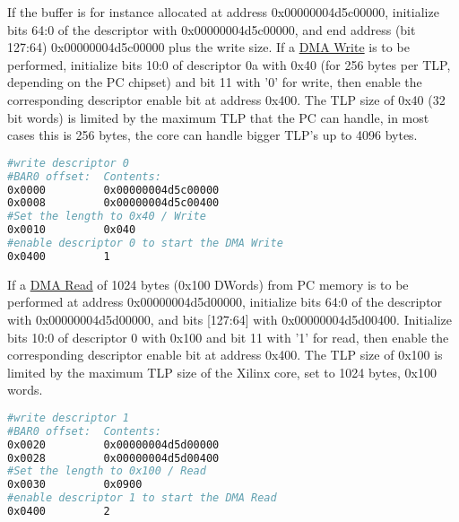 If the buffer is for instance allocated at address 0x00000004d5c00000, initialize bits 64:0 of the descriptor with 0x00000004d5c00000, and end address (bit 127:64) 0x00000004d5c00000 plus the write size. If a \underline{DMA Write} is to be performed, initialize bits 10:0 of descriptor 0a with 0x40 (for 256 bytes per TLP, depending on the PC chipset) and bit 11 with '0' for write, then enable the corresponding descriptor enable bit at address 0x400. The TLP size of 0x40 (32 bit words) is limited by the maximum TLP that the PC can handle, in most cases this is 256 bytes, the core can handle bigger TLP's up to 4096 bytes.
\begin{lstlisting}[language=BASH, frame=single, caption=Create a Write descriptor]
#write descriptor 0
#BAR0 offset:  Contents:
0x0000         0x00000004d5c00000
0x0008         0x00000004d5c00400
#Set the length to 0x40 / Write
0x0010         0x040
#enable descriptor 0 to start the DMA Write
0x0400         1
\end{lstlisting}
If a \underline{DMA Read} of 1024 bytes (0x100 DWords) from PC memory is to be performed at address 0x00000004d5d00000, initialize bits 64:0 of the descriptor with 0x00000004d5d00000, and bits [127:64] with 0x00000004d5d00400. Initialize bits 10:0 of descriptor 0 with 0x100 and bit 11 with '1' for read, then enable the corresponding descriptor enable bit at address 0x400. The TLP size of 0x100 is limited by the maximum TLP size of the Xilinx core, set to 1024 bytes, 0x100 words.
\begin{lstlisting}[language=BASH, frame=single, caption=Create a Read descriptor]
#write descriptor 1
#BAR0 offset:  Contents:
0x0020         0x00000004d5d00000
0x0028         0x00000004d5d00400
#Set the length to 0x100 / Read
0x0030         0x0900
#enable descriptor 1 to start the DMA Read
0x0400         2
\end{lstlisting}
\newpage
